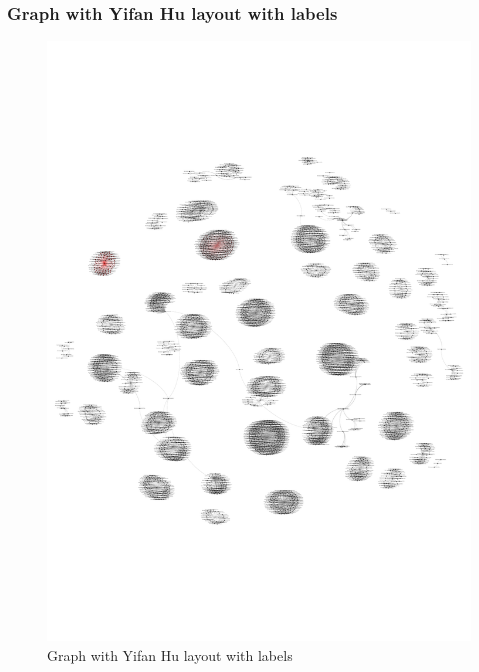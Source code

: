 \subsubsection{Graph with Yifan Hu layout with labels}
\begin{figure}
	 \begin{center}
		\includegraphics[scale=0.8]{q3/A4_q3_with_labels.pdf}
		\caption{Graph with Yifan Hu layout with labels}
		\label{fig:q3-3}
 	\end{center}
\end{figure}
\newpage
